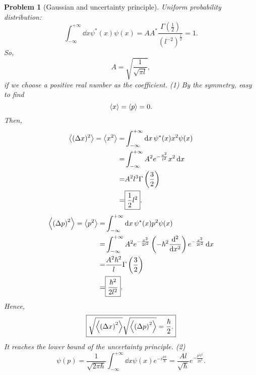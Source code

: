 \documentclass{article}
\theoremstyle{1}
\newtheorem{problem}{Problem}
\begin{document}
\begin{problem}[Gaussian and uncertainty principle]
     Uniform probability distribution:
    \begin{equation}
        \int_{-\infty}^{+\infty}\dd{x}\psi^*(x)\psi(x)=AA^*\frac{\Gamma\left(\frac{1}{2}\right)}{\left(l^{-2}\right)^{\frac{1}{2}}}=1.
    \end{equation}
    So,
    \begin{equation}
        \boxed{A=\sqrt{\frac{1}{\sqrt{\pi l}}},}
    \end{equation}
    if we choose a positive real number as the coefficient.
    \newline
    (1) By the symmetry, easy to find 
    \begin{equation}
        \expval{x}=\expval{p}=0.
    \end{equation}
    Then,
    \begin{align}
        \expval{(\Delta x)^2}=\expval{x^2}=&\int_{-\infty}^{+\infty}\dd{x}\psi^*(x)x^2\psi(x)\notag\\
        =&\int_{-\infty}^{+\infty}A^2e^{-\frac{x^2}{l^2}}x^2\dd{x}\notag\\
        =&A^2l^3\Gamma\left(\frac{3}{2}\right)\notag\\
        =&\boxed{\frac{1}{2}l^2}.
    \end{align}
    \begin{align}
        \expval{\left(\Delta p\right)^2}=\expval{p^2}=&\int_{-\infty}^{+\infty}\dd{x}\psi^*(x)p^2\psi(x)\notag\\
        =&\int_{-\infty}^{+\infty}A^2e^{-\frac{x^2}{2l^2}}\left(-\hbar^2\frac{\dd^2}{\dd{x^2}}\right)e^{-\frac{x^2}{2l^2}}\dd{x}\notag\\
        =&\frac{A^2\hbar^2}{l}\Gamma\left(\frac{3}{2}\right)\notag\\
        =&\boxed{\frac{\hbar^2}{2l^2}}.
    \end{align}
    Hence, 
    \begin{equation}
        \boxed{\sqrt{\expval{\left(\Delta x\right)^2}}\sqrt{\expval{\left(\Delta p\right)^2}}=\frac{\hbar}{2}.}
    \end{equation}
    It reaches the lower bound of the uncertainty principle.
    \newline
    (2)\begin{equation}
        \psi(p)=\frac{1}{\sqrt{2\pi\hbar}}\int_{-\infty}^{+\infty}\dd{x}\psi(x)e^{-i\frac{px}{\hbar}}=\frac{Al}{\sqrt{\hbar}}e^{-\frac{p^2l^2}{2\hbar^2}}.
    \end{equation}

\end{problem}
\end{document}
